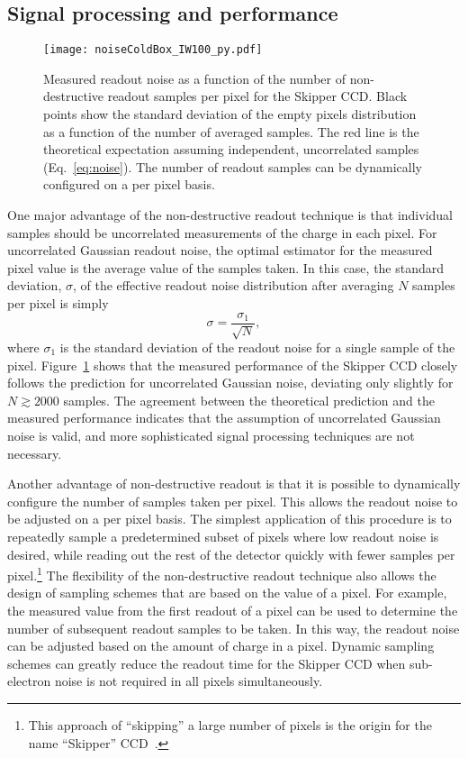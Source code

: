 \documentclass[aps,prl,reprint,superscriptaddress,floatfix,nofootinbib,showkeys,showpacs,preprintnumbers]{revtex4-1}
\begin{document}
\subsection{Signal processing and performance}

\begin{figure}
\centering
\texttt{[image: noiseColdBox\_IW100\_py.pdf]}
\caption{
Measured readout noise as a function of the number of non-destructive readout samples per pixel for the Skipper CCD. Black points show the standard deviation of the empty pixels distribution as a function of the number of averaged samples. The red line is the theoretical expectation assuming independent, uncorrelated samples (Eq.~\eqref{eq:noise}). The number of readout samples can be dynamically configured on a per pixel basis.
}
\label{fig:noiseVsN}
\end{figure}

One major advantage of the non-destructive readout technique is that individual samples should be uncorrelated measurements of the charge in each pixel.
For uncorrelated Gaussian readout noise, the optimal estimator for the measured pixel value is the average value of the samples taken. 
In this case, the standard deviation, $\sigma$, of the effective readout noise distribution after averaging $N$ samples per pixel is simply
\begin{equation}
\label{eq:noise}
\sigma=\frac{\sigma_{1}}{\sqrt{N}},
\end{equation}
where $\sigma_{1}$ is the standard deviation of the readout noise for a single sample of the pixel. 
Figure~\ref{fig:noiseVsN} shows that the measured performance of the Skipper CCD closely follows the prediction for uncorrelated Gaussian noise, deviating only slightly for $N \gtrsim 2000$ samples. 
The agreement between the theoretical prediction and the measured performance indicates that the assumption of uncorrelated Gaussian noise is valid, and more sophisticated signal processing techniques are not necessary.

Another advantage of non-destructive readout is that it is possible to dynamically configure the number of samples taken per pixel.
This allows the readout noise to be adjusted on a per pixel basis.
The simplest application of this procedure is to repeatedly sample a predetermined subset of pixels where low readout noise is desired, while reading out the rest of the detector quickly with fewer samples per pixel.\footnote{This approach of ``skipping'' a large number of pixels is the origin for the name ``Skipper'' CCD~\citep{Janesick:2001}.}
The flexibility of the non-destructive readout technique also allows the design of sampling schemes that are based on the value of a pixel. 
For example, the measured value from the first readout of a pixel can be used to determine the number of subsequent readout samples to be taken.
In this way, the readout noise can be adjusted based on the amount of charge in a pixel.
Dynamic sampling schemes can greatly reduce the readout time for the Skipper CCD when sub-electron noise is not required in all pixels simultaneously. 
\end{document}
